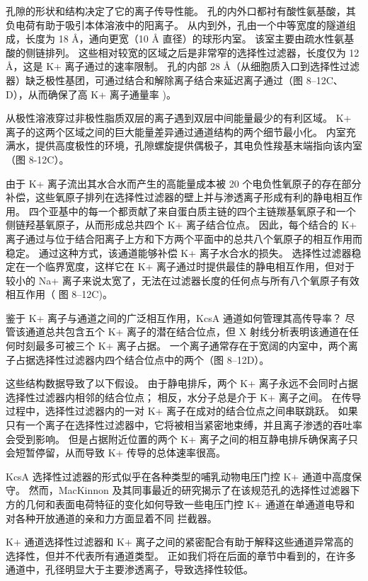 孔隙的形状和结构决定了它的离子传导性能。 孔的内外口都衬有酸性氨基酸，其负电荷有助于吸引本体溶液中的阳离子。 从内到外，孔由一个中等宽度的隧道组成，长度为 18 Å，通向更宽（10 Å 直径）的球形内室。 该室主要由疏水性氨基酸的侧链排列。 这些相对较宽的区域之后是非常窄的选择性过滤器，长度仅为 12 Å，这是 K+ 离子通过的速率限制。 孔的内部 28 Å（从细胞质入口到选择性过滤器）缺乏极性基团，可通过结合和解除离子结合来延迟离子通过（图 8–12C、D），从而确保了高 K+ 离子通量率 )。

从极性溶液穿过非极性脂质双层的离子遇到双层中间能量最少的有利区域。 K+ 离子的这两个区域之间的巨大能量差异通过通道结构的两个细节最小化。 内室充满水，提供高度极性的环境，孔隙螺旋提供偶极子，其电负性羧基末端指向该内室（图 8-12C）。

由于 K+ 离子流出其水合水而产生的高能量成本被 20 个电负性氧原子的存在部分补偿，这些氧原子排列在选择性过滤器的壁上并与渗透离子形成有利的静电相互作用。 四个亚基中的每一个都贡献了来自蛋白质主链的四个主链羰基氧原子和一个侧链羟基氧原子，从而形成总共四个 K+ 离子结合位点。 因此，每个结合的 K+ 离子通过与位于结合阳离子上方和下方两个平面中的总共八个氧原子的相互作用而稳定。 通过这种方式，该通道能够补偿 K+ 离子水合水的损失。 选择性过滤器稳定在一个临界宽度，这样它在 K+ 离子通过时提供最佳的静电相互作用，但对于较小的 Na+ 离子来说太宽了，无法在过滤器长度的任何点与所有八个氧原子有效相互作用（ 图 8–12C)。

鉴于 K+ 离子与通道之间的广泛相互作用，KcsA 通道如何管理其高传导率？ 尽管该通道总共包含五个 K+ 离子的潜在结合位点，但 X 射线分析表明该通道在任何时刻最多可被三个 K+ 离子占据。 一个离子通常存在于宽阔的内室中，两个离子占据选择性过滤器内四个结合位点中的两个（图 8–12D）。

这些结构数据导致了以下假设。 由于静电排斥，两个 K+ 离子永远不会同时占据选择性过滤器内相邻的结合位点； 相反，水分子总是介于 K+ 离子之间。 在传导过程中，选择性过滤器内的一对 K+ 离子在成对的结合位点之间串联跳跃。 如果只有一个离子在选择性过滤器中，它将被相当紧密地束缚，并且离子渗透的吞吐率会受到影响。 但是占据附近位置的两个 K+ 离子之间的相互静电排斥确保离子只会短暂停留，从而导致 K+ 传导的总体速率很高。

KcsA 选择性过滤器的形式似乎在各种类型的哺乳动物电压门控 K+ 通道中高度保守。 然而，MacKinnon 及其同事最近的研究揭示了在该规范孔的选择性过滤器下方的几何和表面电荷特征的变化如何导致一些电压门控 K+ 通道在单通道电导和对各种开放通道的亲和力方面显着不同 拦截器。

K+ 通道选择性过滤器和 K+ 离子之间的紧密配合有助于解释这些通道异常高的选择性，但并不代表所有通道类型。 正如我们将在后面的章节中看到的，在许多通道中，孔径明显大于主要渗透离子，导致选择性较低。




